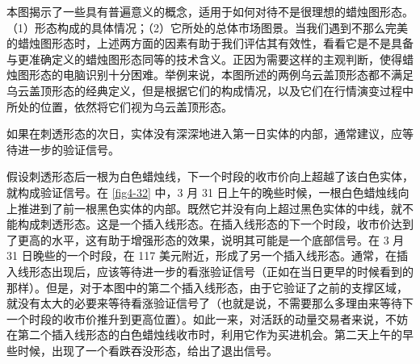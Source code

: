 本图揭示了一些具有普遍意义的概念，适用于如何对待不是很理想的蜡烛图形态。（1）形态构成的具体情况；（2）它所处的总体市场图景。当我们遇到不那么完美的蜡烛图形态时，上述两方面的因素有助于我们评估其有效性，看看它是不是具备与更准确定义的蜡烛图形态同等的技术含义。正因为需要这样的主观判断，使得蜡烛图形态的电脑识别十分困难。举例来说，本图所述的两例乌云盖顶形态都不满足乌云盖顶形态的经典定义，但是根据它们的构成情况，以及它们在行情演变过程中所处的位置，依然将它们视为乌云盖顶形态。

\begin{tcolorbox}
    如果在刺透形态的次日，实体没有深深地进入第一日实体的内部，通常建议，应等待进一步的验证信号。
\end{tcolorbox}


假设刺透形态后一根为白色蜡烛线，下一个时段的收市价向上超越了该白色实体，就构成验证信号。在 \autoref{fig4-32} 中，3 月 31 日上午的晚些时候，一根白色蜡烛线向上推进到了前一根黑色实体的内部。既然它并没有向上超过黑色实体的中线，就不能构成刺透形态。这是一个插入线形态。在插入线形态的下一个时段，收市价达到了更高的水平，这有助于增强形态的效果，说明其可能是一个底部信号。在 3 月 31 日晚些的一个时段，在 117 美元附近，形成了另一个插入线形态。通常，在插入线形态出现后，应该等待进一步的看涨验证信号（正如在当日更早的时候看到的那样）。但是，对于本图中的第二个插入线形态，由于它验证了之前的支撑区域，就没有太大的必要来等待看涨验证信号了（也就是说，不需要那么多理由来等待下一个时段的收市价推升到更高位置）。如此一来，对活跃的动量交易者来说，不妨在第二个插入线形态的白色蜡烛线收市时，利用它作为买进机会。第二天上午的早些时候，出现了一个看跌吞没形态，给出了退出信号。

